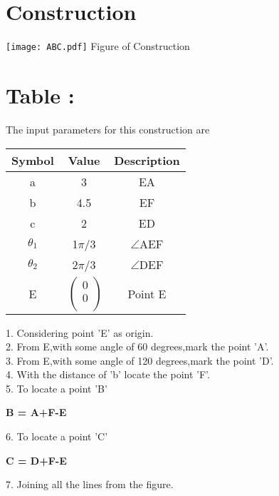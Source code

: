 \documentclass[10pt,a4paper]{report}
\newcommand{\myvec}[1]{\ensuremath{\begin{pmatrix}#1\end{pmatrix}}}
\let\myvec\bf
\begin{document}
\begin{multicols}{2}
\section{Construction}
  \begin{center}
     \texttt{[image: ABC.pdf]} 
     Figure of Construction
   \end{center}
   \vspace{5mm}

\section{Table :}

The input parameters for this construction are 
\begin{center}
\begin{tabular}{|c|c|c|}
	\hline
	\textbf{Symbol}&\textbf{Value}&\textbf{Description}\\
	\hline
	a&3&EA\\
	\hline
	b&4.5&EF\\
	\hline
	c&2&ED\\
	\hline
	${\theta}_1$& 1$\pi/3$&$ \angle $AEF\\ 
	\hline
	${\theta}_2$& 2$\pi/3$&$ \angle $DEF\\ 
	    \hline
	E&$\
	\begin{pmatrix}
		0 \\
		0 \\
	\end{pmatrix}$%
	&Point E\\
	\hline
\end{tabular}
\end{center}

1. Considering point 'E' as origin.\\
2. From E,with some angle of 60 degrees,mark the point 'A'.\\
3. From E,with some angle of 120 degrees,mark the point 'D'.\\
4. With the distance of 'b' locate the point 'F'.\\
5. To locate a point 'B'\\
\begin{center}
    \myvec{ B = A+F-E }
\end{center}
6. To locate a point 'C'\\
\begin{center}
    \myvec{ C = D+F-E }
\end{center}
7. Joining all the lines from the figure.
\vspace{0.5cm}\\

\end{multicols}
\end{document}
